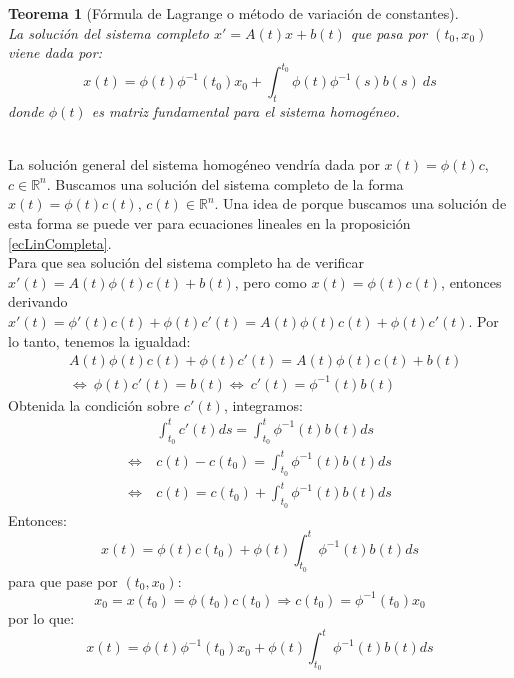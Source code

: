 \documentclass[11pt]{article}
\makeatletter
\theoremstyle{theorem-style}  %
\newtheorem{theorem}{Teorema}[section]  %
\renewenvironment{proof}[1][\proofname]{\par
	\pushQED{\qed}%
	\normalfont \topsep6\p@\@plus6\p@\relax
	\list{}{%
		\settowidth{\leftmargin}{\quad:\hskip\labelsep}%
		\setlength{\labelwidth}{0pt}%
		\setlength{\itemindent}{-\leftmargin}%
	}%
	\item[\hskip\labelsep\itshape#1\@addpunct{:}]\ignorespaces
}{%
	\popQED\endlist\@endpefalse
}
\theoremstyle{definition-style}
\theoremstyle{example-style}
\makeatother
\begin{document}
\begin{theorem}[Fórmula de Lagrange o método de variación de constantes]\label{lagrange-formula}\ \\
	La solución del sistema completo $x' = A(t)x + b(t)$ que pasa por $(t_0, x_0)$ viene dada por:
	\[x(t) = \phi(t) \phi^{-1}(t_0) x_0 + \int_{t}^{t_0}\phi(t) \phi^{-1}(s) b(s) \ ds\]
	donde $\phi(t)$ es matriz fundamental para el sistema homogéneo.
\end{theorem}
\begin{proof}\ \\
	La solución general del sistema homogéneo vendría dada por $x(t) = \phi (t) c$, $c \in \mathbb{R}^n$. Buscamos una solución del sistema completo de la forma $x(t) = \phi (t) c(t)$, $c(t) \in \mathbb{R}^n$. Una idea de porque buscamos una solución de esta forma se puede ver para ecuaciones lineales en la proposición \ref{ecLinCompleta}.\\
	Para que sea solución del sistema completo ha de verificar $ x'(t)=A(t)\phi(t)c(t)+b(t) $, pero como $ x(t)=  \phi (t) c(t) $, entonces derivando $ x'(t)= \phi'(t)c(t) + \phi(t)c'(t)=A(t)\phi(t)c(t) + \phi(t)c'(t)$. Por lo tanto, tenemos la igualdad:
	\begin{align*}
		&A(t)\phi(t)c(t) + \phi(t)c'(t)= A(t)\phi(t)c(t) + b(t) \\
		&\Leftrightarrow \ \phi(t)c'(t) = b(t) \Leftrightarrow \ c'(t) = \phi^{-1}(t) b(t)
	\end{align*}
	Obtenida la condición sobre $ c'(t) $, integramos:
	\begin{align*}
	& \int_{t_0}^{t} c'(t) ds = \int_{t_0}^{t} \phi^{-1}(t) b(t) ds\\
	\Leftrightarrow \ &c(t) - c(t_0) = \int_{t_0}^{t} \phi^{-1}(t) b(t) ds\\
	\Leftrightarrow \ &c(t) = c(t_0) + \int_{t_0}^{t} \phi^{-1}(t) b(t) ds
	\end{align*}
	Entonces:
	\[x(t) = \phi(t) c(t_0) + \phi(t) \int_{t_0}^{t} \phi^{-1}(t) b(t) ds\]
	para que pase por $(t_0, x_0)$:
	\[x_0 = x(t_0) = \phi (t_0) c(t_0) \Rightarrow c(t_0) = \phi^{-1}(t_0) x_0 \] 
	por lo que:
	\[x(t) = \phi(t) \phi^{-1}(t_0) x_0 + \phi(t) \int_{t_0}^{t} \phi^{-1}(t) b(t) ds\]
\end{proof}
\pagebreak
\end{document}
